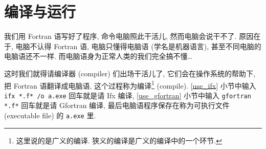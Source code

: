 \section{编译与运行}\label{run_fortran}

我们用 Fortran 语写好了程序, 命令电脑照此干活儿, 然而电脑会说干不了. 原因在于, 电脑不认得 Fortran 语, 电脑只懂得电脑语 (学名是机器语言), 甚至不同电脑的电脑语还不一样. 而电脑语身为正常人类的我们完全搞不懂\dots{}

这时我们就得请编译器 (compiler) 们出场干活儿了, 它们会在操作系统的帮助下, 把 Fortran 语翻译成电脑语, 这个过程称为编译\footnote{这里说的是广义的编译. 狭义的编译是广义的编译中的一个环节.} (compile). \ref{use_ifx} 小节中输入 \texttt{ifx *.f* /o a.exe} 回车就是请 Ifx 编译, \ref{use_gfortran} 小节中输入 \texttt{gfortran *.f*} 回车就是请 Gfortran 编译, 最后电脑语程序保存在称为可执行文件 (executable file) 的 \texttt{a.exe} 里.


